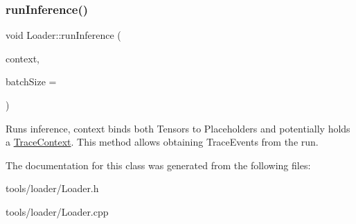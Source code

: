 \subsubsection{\texorpdfstring{run\+Inference()}{runInference()}\hspace{0.1cm}{\footnotesize\ttfamily [2/2]}}
{\footnotesize\ttfamily void Loader\+::run\+Inference (\begin{DoxyParamCaption}\item[{\hyperlink{classglow_1_1_execution_context}{Execution\+Context} $\ast$}]{context,  }\item[{size\+\_\+t}]{batch\+Size = {} }\end{DoxyParamCaption})}

Runs inference, {\ttfamily context} binds both Tensors to Placeholders and potentially holds a \hyperlink{classglow_1_1_trace_context}{Trace\+Context}. This method allows obtaining Trace\+Events from the run. 

The documentation for this class was generated from the following files\+:\begin{DoxyCompactItemize}
\item 
tools/loader/Loader.\+h\item 
tools/loader/Loader.\+cpp\end{DoxyCompactItemize}

